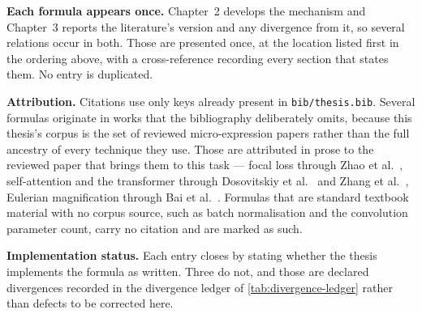 \textbf{Each formula appears once.} Chapter~2 develops the mechanism and
Chapter~3 reports the literature's version and any divergence from it, so
several relations occur in both. Those are presented once, at the location
listed first in the ordering above, with a cross-reference recording every
section that states them. No entry is duplicated.

\textbf{Attribution.} Citations use only keys already present in
\texttt{bib/thesis.bib}. Several formulas originate in works that the
bibliography deliberately omits, because this thesis's corpus is the set of
reviewed micro-expression papers rather than the full ancestry of every
technique they use. Those are attributed in prose to the reviewed paper that
brings them to this task --- focal loss through Zhao et
al.~\cite{zhaoS2021}, self-attention and the transformer through Dosovitskiy
et al.~\cite{dosovitskiy2021} and Zhang et al.~\cite{zhang2022}, Eulerian
magnification through Bai et al.~\cite{bai2021}. Formulas that are standard
textbook material with no corpus source, such as batch normalisation and the
convolution parameter count, carry no citation and are marked as such.

\textbf{Implementation status.} Each entry closes by stating whether the
thesis implements the formula as written. Three do not, and those are declared
divergences recorded in the divergence ledger of \autoref{tab:divergence-ledger}
rather than defects to be corrected here.

